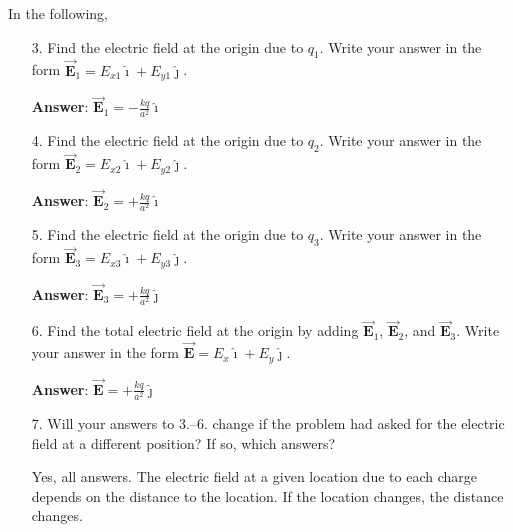 \documentclass{article}
\newcommand{\ds}[0]{\displaystyle}
\newcommand{\ihat}[0]{\hat{\boldsymbol{\imath}}}
\newcommand{\jhat}[0]{\hat{\boldsymbol{\jmath}}}
\newcommand{\bfvec}[1]{\vec{\mathbf{#1}}}
\begin{document}
In the following, 

\begin{enumerate}

  \item[3.] Find the electric field at the origin due to $q_1$. Write your answer in the form $\bfvec{E}_1=E_{x1}\ihat + E_{y1}\jhat$.

            \ifsolutions
            {\bf Answer}: $\ds\bfvec{E}_1=-\frac{kq}{a^2}\ihat$
            \else

            \vskip 72pt
            \fi
            \ifsolutions\else
            \vskip 72pt
            \fi

  \item[4.] Find the electric field at the origin due to $q_2$. Write your answer in the form $\bfvec{E}_2=E_{x2}\ihat + E_{y2}\jhat$.

            \ifsolutions
            {\bf Answer}: $\ds\bfvec{E}_2=+\frac{kq}{a^2}\ihat$
            \else

            \vskip 72pt
            \fi
            \ifsolutions\else
            \vskip 72pt
            \fi

  \item[5.] Find the electric field at the origin due to $q_3$. Write your answer in the form $\bfvec{E}_3=E_{x3}\ihat + E_{y3}\jhat$.

            \ifsolutions
            {\bf Answer}: $\ds\bfvec{E}_3=+\frac{kq}{a^2}\jhat$
            \else

            \vskip 72pt
            \fi
            \ifsolutions\else
            \vskip 72pt
            \fi

  \item[6.] Find the total electric field at the origin by adding $\bfvec{E}_1$, $\bfvec{E}_2$, and $\bfvec{E}_3$. Write your answer in the form $\bfvec{E}=E_{x}\ihat + E_{y}\jhat$.

            \ifsolutions
            {\bf Answer}: $\ds\bfvec{E}=+\frac{kq}{a^2}\jhat$
            \else

            \vskip 72pt
            \fi
            \ifsolutions\else
            \vskip 72pt
            \fi

  \item[7.] Will your answers to 3.--6. change if the problem had asked for the electric field at a different position? If so, which answers?

            \ifsolutions
            Yes, all answers. The electric field at a given location due to each charge depends on the distance to the location. If the location changes, the distance changes.
            \else


\end{enumerate}
\end{document}
